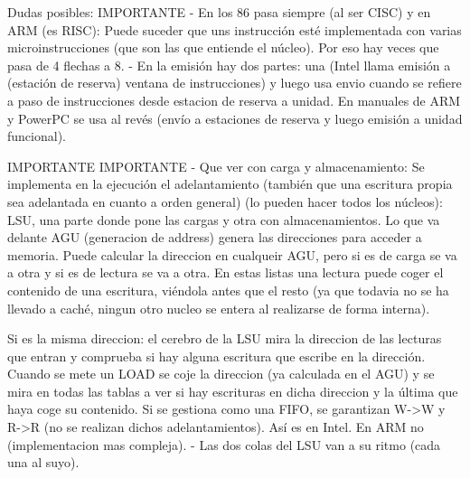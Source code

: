 




Dudas posibles: IMPORTANTE
- En los 86 pasa siempre (al ser CISC) y en ARM (es RISC): Puede suceder que uns instrucción esté implementada con varias microinstrucciones (que son las que entiende el núcleo). Por eso hay veces que pasa de 4 flechas a 8.
- En la emisión hay dos partes: una (Intel llama emisión a (estación de reserva) ventana de instrucciones) y luego usa envio cuando se refiere a paso de instrucciones desde estacion de reserva a unidad. En manuales de ARM y PowerPC se usa al revés (envío a estaciones de reserva y luego emisión a unidad funcional).

IMPORTANTE 
IMPORTANTE 
- Que ver con carga y almacenamiento: Se implementa en la ejecución el adelantamiento (también que una escritura propia sea adelantada en cuanto a orden general) (lo pueden hacer todos los núcleos): LSU, una parte donde pone las cargas y otra con almacenamientos. Lo que va delante AGU (generacion de address) genera las direcciones para acceder a memoria. Puede calcular la direccion en cualqueir AGU, pero si es de carga se va a otra y si es de lectura se va a otra. En estas listas una lectura puede coger el contenido de una escritura, viéndola antes que el resto (ya que todavia no se ha llevado a caché, ningun otro nucleo se entera al realizarse de forma interna).

Si es la misma direccion: el cerebro de la LSU mira la direccion de las lecturas que entran y comprueba si hay alguna escritura que escribe en la dirección. Cuando se mete un LOAD se coje la direccion (ya calculada en el AGU) y se mira en todas las tablas a ver si hay escrituras en dicha direccion y la última que haya coge su contenido.
Si se gestiona como una FIFO, se garantizan W->W y R->R (no se realizan dichos adelantamientos). Así es en Intel. En ARM no (implementacion mas compleja).
- Las dos colas del LSU van a su ritmo (cada una al suyo). 

